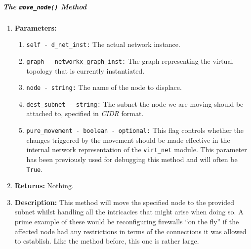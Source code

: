    \subparagraph{The \texttt{move\_node()} Method}
        \begin{enumerate}
            \item \textbf{Parameters:}
            \begin{enumerate}
                \item \texttt{self - d\_net\_inst:} The actual network instance.
                \item \texttt{graph - networkx\_graph\_inst:} The graph representing the virtual topology that is currently instantiated.
                \item \texttt{node - string:} The name of the node to displace.
                \item \texttt{dest\_subnet - string:} The subnet the node we are moving should be attached to, specified in \textit{CIDR} format.
                \item \texttt{pure\_movement - boolean - optional:} This flag controls whether the changes triggered by the movement should be made effective in the internal network representation of the \texttt{virt\_net} module. This parameter has been previously used for debugging this method and will often be \texttt{True}.
            \end{enumerate}
            \item \textbf{Returns:} Nothing.
            \item \textbf{Description:} This method will move the specified node to the provided subnet whilst handling all the intricacies that might arise when doing so. A prime example of these would be reconfiguring firewalls ``on the fly'' if the affected node had any restrictions in terms of the connections it was allowed to establish. Like the method before, this one is rather large.
        \end{enumerate}
